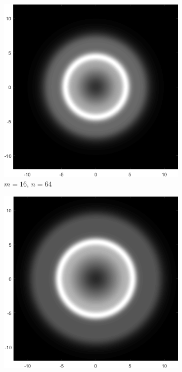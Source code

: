 \documentclass[12pt]{amsart}
\theoremstyle{remark}
\begin{document}
\begin{figure}[h]
	\begin{subfigure}[b]{.35\textwidth}
		\includegraphics[width=\textwidth]{./img/DensityPlot1664crop}
		\caption{$m=16$, $n=64$}
	\end{subfigure}
	\begin{subfigure}[b]{.35\textwidth}
		\includegraphics[width=\textwidth]{./img/DensityPlot25100crop}

\end{subfigure}
\end{figure}
\end{document}
